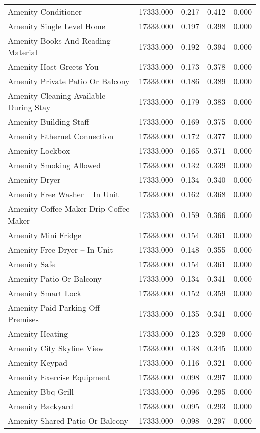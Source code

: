 \begin{tabular}{lllll}
Amenity Conditioner & 17333.000 & 0.217 & 0.412 & 0.000 \\
Amenity Single Level Home & 17333.000 & 0.197 & 0.398 & 0.000 \\
Amenity Books And Reading Material & 17333.000 & 0.192 & 0.394 & 0.000 \\
Amenity Host Greets You & 17333.000 & 0.173 & 0.378 & 0.000 \\
Amenity Private Patio Or Balcony & 17333.000 & 0.186 & 0.389 & 0.000 \\
Amenity Cleaning Available During Stay & 17333.000 & 0.179 & 0.383 & 0.000 \\
Amenity Building Staff & 17333.000 & 0.169 & 0.375 & 0.000 \\
Amenity Ethernet Connection & 17333.000 & 0.172 & 0.377 & 0.000 \\
Amenity Lockbox & 17333.000 & 0.165 & 0.371 & 0.000 \\
Amenity Smoking Allowed & 17333.000 & 0.132 & 0.339 & 0.000 \\
Amenity Dryer & 17333.000 & 0.134 & 0.340 & 0.000 \\
Amenity Free Washer – In Unit & 17333.000 & 0.162 & 0.368 & 0.000 \\
Amenity Coffee Maker Drip Coffee Maker & 17333.000 & 0.159 & 0.366 & 0.000 \\
Amenity Mini Fridge & 17333.000 & 0.154 & 0.361 & 0.000 \\
Amenity Free Dryer – In Unit & 17333.000 & 0.148 & 0.355 & 0.000 \\
Amenity Safe & 17333.000 & 0.154 & 0.361 & 0.000 \\
Amenity Patio Or Balcony & 17333.000 & 0.134 & 0.341 & 0.000 \\
Amenity Smart Lock & 17333.000 & 0.152 & 0.359 & 0.000 \\
Amenity Paid Parking Off Premises & 17333.000 & 0.135 & 0.341 & 0.000 \\
Amenity Heating & 17333.000 & 0.123 & 0.329 & 0.000 \\
Amenity City Skyline View & 17333.000 & 0.138 & 0.345 & 0.000 \\
Amenity Keypad & 17333.000 & 0.116 & 0.321 & 0.000 \\
Amenity Exercise Equipment & 17333.000 & 0.098 & 0.297 & 0.000 \\
Amenity Bbq Grill & 17333.000 & 0.096 & 0.295 & 0.000 \\
Amenity Backyard & 17333.000 & 0.095 & 0.293 & 0.000 \\
Amenity Shared Patio Or Balcony & 17333.000 & 0.098 & 0.297 & 0.000 \\

\end{tabular}
